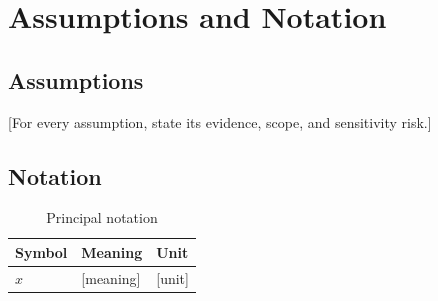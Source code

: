 \section{Assumptions and Notation}
\subsection{Assumptions}
[For every assumption, state its evidence, scope, and sensitivity risk.]
\subsection{Notation}
\begin{table}[!htbp]\centering\caption{Principal notation}\label{tab:notation}
\begin{tabular}{lll}\toprule Symbol & Meaning & Unit\\\midrule $x$ & [meaning] & [unit]\\\bottomrule\end{tabular}
\end{table}
